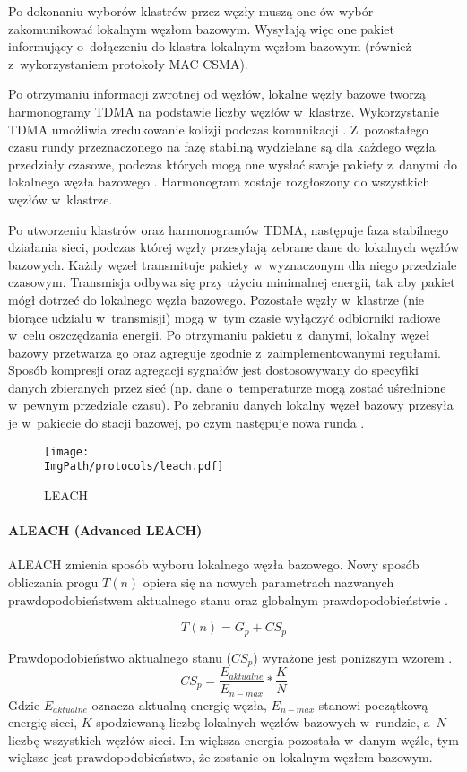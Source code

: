 Po dokonaniu wyborów klastrów przez węzły muszą one ów wybór zakomunikować lokalnym węzłom bazowym. Wysyłają więc one pakiet informujący o~dołączeniu do klastra lokalnym węzłom bazowym (również z~wykorzystaniem protokoły MAC CSMA).

Po otrzymaniu informacji zwrotnej od węzłów, lokalne węzły bazowe tworzą harmonogramy TDMA na podstawie liczby węzłów w~klastrze. Wykorzystanie TDMA umożliwia zredukowanie kolizji podczas komunikacji \cite{Ilyas2004, Ergen2010}. Z~pozostałego czasu rundy przeznaczonego na fazę stabilną wydzielane są dla każdego węzła przedziały czasowe, podczas których mogą one wysłać swoje pakiety z~danymi do lokalnego węzła bazowego \cite{Cionca2008}. Harmonogram zostaje rozgłoszony do wszystkich węzłów w~klastrze.

Po utworzeniu klastrów oraz harmonogramów TDMA, następuje faza stabilnego działania sieci, podczas której węzły przesyłają zebrane dane do lokalnych węzłów bazowych. Każdy węzeł transmituje pakiety w~wyznaczonym dla niego przedziale czasowym. Transmisja odbywa się przy użyciu minimalnej energii, tak aby pakiet mógł dotrzeć do lokalnego węzła bazowego. Pozostałe węzły w~klastrze (nie biorące udziału w~transmisji) mogą w~tym czasie wyłączyć odbiorniki radiowe w~celu oszczędzania energii. Po otrzymaniu pakietu z~danymi, lokalny węzeł bazowy przetwarza go oraz agreguje zgodnie z~zaimplementowanymi regułami. Sposób kompresji oraz agregacji sygnałów jest dostosowywany do specyfiki danych zbieranych przez sieć (np. dane o~temperaturze mogą zostać uśrednione w~pewnym przedziale czasu). Po zebraniu danych lokalny węzeł bazowy przesyła je w~pakiecie do stacji bazowej, po czym następuje nowa runda \cite{Yadav2014}.
\begin{figure}[H]
	\begin{center}
		\texttt{[image: \\ImgPath/protocols/leach.pdf]}
	\end{center}
	\caption{LEACH}
\end{figure}
\paragraph{ALEACH (Advanced LEACH)} \label{para:aleach}
ALEACH zmienia sposób wyboru lokalnego węzła bazowego. Nowy sposób obliczania progu $T(n)$ opiera się na nowych parametrach nazwanych prawdopodobieństwem aktualnego stanu oraz globalnym prawdopodobieństwie \cite{Ali2008}.

\[
	T(n) = G_{p} + CS_{p}
\]

Prawdopodobieństwo aktualnego stanu ($CS_{p}$) wyrażone jest poniższym wzorem \cite{Ali2008}.
\[
	CS_{p} = \frac{E_{aktualne}}{E_{n-max}}*\frac{K}{N}
\]
Gdzie $E_{aktualne}$ oznacza aktualną energię węzła, $E_{n-max}$ stanowi początkową energię sieci, $K$ spodziewaną liczbę lokalnych węzłów bazowych w~rundzie, a~$N$ liczbę wszystkich węzłów sieci. Im większa energia pozostała w~danym węźle, tym większe jest prawdopodobieństwo, że zostanie on lokalnym węzłem bazowym.


